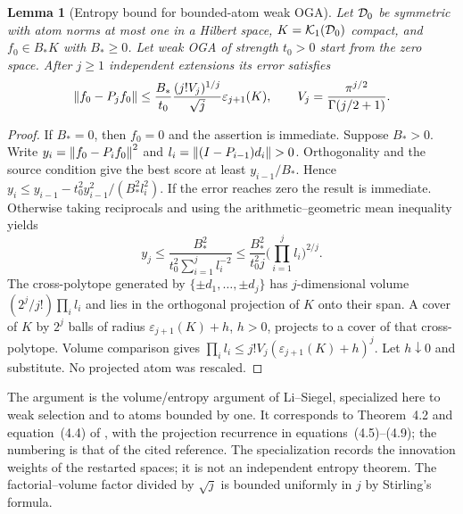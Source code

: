 \documentclass[11pt]{article}
\newtheorem{lemma}[theorem]{Lemma}
\theoremstyle{remark}
\begin{document}
\begin{lemma}[Entropy bound for bounded-atom weak OGA]
\label{lem:c5-entropy}
Let $\mathcal D_0$ be symmetric with atom norms at most one in a Hilbert space,
$K=\mathcal K_1(\mathcal D_0)$ compact, and $f_0\in B_*K$ with $B_*\geq0$.
Let weak OGA of strength $t_0>0$ start from the zero space.
After $j\geq1$ independent extensions its error satisfies
\begin{equation}
 \left\lVert f_0-P_jf_0\right\rVert\leq
 \frac{B_*}{t_0}\frac{(j!V_j)^{1/j}}{\sqrt j}
                    \varepsilon_{j+1}(K),\qquad
 V_j=\frac{\pi^{j/2}}{\Gamma(j/2+1)} .
 \label{eq:c5-entropy}
\end{equation}
\end{lemma}
\begin{proof}
If $B_*=0$, then $f_0=0$ and the assertion is immediate. Suppose $B_*>0$.
Write $y_i=\left\lVert f_0-P_if_0\right\rVert^2$ and
$l_i=\left\lVert(I-P_{i-1})d_i\right\rVert>0$.
Orthogonality and the source condition give the best score at least
$y_{i-1}/B_*$. Hence
$y_i\leq y_{i-1}-t_0^2y_{i-1}^2/(B_*^2l_i^2)$.
If the error reaches zero the result is immediate. Otherwise taking
reciprocals and using the arithmetic--geometric mean inequality yields
\[
 y_j\leq \frac{B_*^2}{t_0^2\sum_{i=1}^jl_i^{-2}}
 \leq \frac{B_*^2}{t_0^2j}\Big(\prod_{i=1}^jl_i\Big)^{2/j}.
\]
The cross-polytope generated by $\{\pm d_1,\ldots,\pm d_j\}$ has
$j$-dimensional volume $(2^j/j!)\prod_i l_i$ and lies in the orthogonal
projection of $K$ onto their span. A cover of $K$ by $2^j$ balls of radius
\(\varepsilon_{j+1}(K)+h\), \(h>0\), projects to a cover of that
cross-polytope. Volume comparison gives
$\prod_i l_i\leq j!V_j(\varepsilon_{j+1}(K)+h)^j$.
Let $h\downarrow0$ and substitute. No projected atom was rescaled.
\end{proof}

The argument is the volume/entropy argument of Li--Siegel, specialized here
to weak selection and to atoms bounded by one. It corresponds
to Theorem~4.2 and equation~(4.4) of \cite{LiSiegelEntropy2024}, with the
projection recurrence in equations~(4.5)--(4.9); the numbering is that of the
cited reference. The specialization records the innovation
weights of the restarted spaces; it is not an independent entropy theorem.
The factorial--volume factor divided by $\sqrt j$ is bounded uniformly
in $j$ by Stirling's formula.
\end{document}
